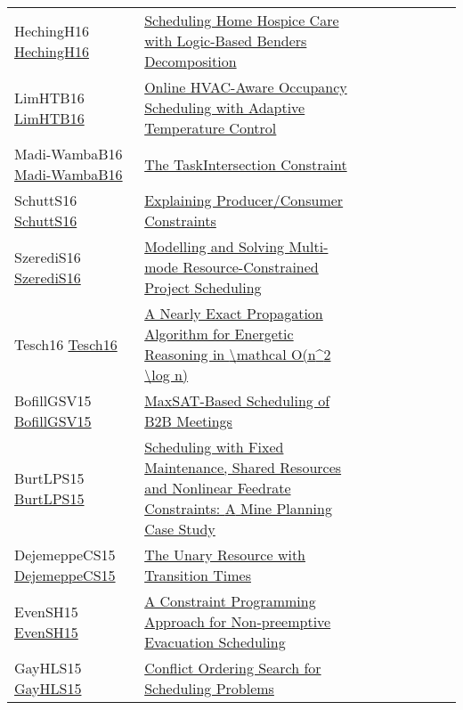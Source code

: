 {\begin{longtable}{p{3cm}p{7cm}lllllll}
HechingH16 \href{https://doi.org/10.1007/978-3-319-33954-2\_14}{HechingH16} &  \href{papers/HechingH16.pdf}{Scheduling Home Hospice Care with Logic-Based Benders Decomposition} &  &  &  &  &  &  & \\
LimHTB16 \href{https://doi.org/10.1007/978-3-319-44953-1\_43}{LimHTB16} &  \href{papers/LimHTB16.pdf}{Online HVAC-Aware Occupancy Scheduling with Adaptive Temperature Control} &  &  &  &  &  &  & \\
Madi-WambaB16 \href{https://doi.org/10.1007/978-3-319-33954-2\_18}{Madi-WambaB16} &  \href{papers/Madi-WambaB16.pdf}{The TaskIntersection Constraint} &  &  &  &  &  &  & \\
SchuttS16 \href{https://doi.org/10.1007/978-3-319-44953-1\_28}{SchuttS16} &  \href{papers/SchuttS16.pdf}{Explaining Producer/Consumer Constraints} &  &  &  &  &  &  & \\
SzerediS16 \href{https://doi.org/10.1007/978-3-319-44953-1\_31}{SzerediS16} &  \href{papers/SzerediS16.pdf}{Modelling and Solving Multi-mode Resource-Constrained Project Scheduling} &  &  &  &  &  &  & \\
Tesch16 \href{https://doi.org/10.1007/978-3-319-44953-1\_32}{Tesch16} &  \href{papers/Tesch16.pdf}{A Nearly Exact Propagation Algorithm for Energetic Reasoning in {\textbackslash}mathcal O(n{\^{}}2 {\textbackslash}log n)} &  &  &  &  &  &  & \\
BofillGSV15 \href{https://doi.org/10.1007/978-3-319-18008-3\_5}{BofillGSV15} &  \href{papers/BofillGSV15.pdf}{MaxSAT-Based Scheduling of {B2B} Meetings} &  &  &  &  &  &  & \\
BurtLPS15 \href{https://doi.org/10.1007/978-3-319-18008-3\_7}{BurtLPS15} &  \href{papers/BurtLPS15.pdf}{Scheduling with Fixed Maintenance, Shared Resources and Nonlinear Feedrate Constraints: {A} Mine Planning Case Study} &  &  &  &  &  &  & \\
DejemeppeCS15 \href{https://doi.org/10.1007/978-3-319-23219-5\_7}{DejemeppeCS15} &  \href{papers/DejemeppeCS15.pdf}{The Unary Resource with Transition Times} &  &  &  &  &  &  & \\
EvenSH15 \href{https://doi.org/10.1007/978-3-319-23219-5\_40}{EvenSH15} &  \href{papers/EvenSH15.pdf}{A Constraint Programming Approach for Non-preemptive Evacuation Scheduling} &  &  &  &  &  &  & \\
GayHLS15 \href{https://doi.org/10.1007/978-3-319-23219-5\_10}{GayHLS15} &  \href{papers/GayHLS15.pdf}{Conflict Ordering Search for Scheduling Problems} &  &  &  &  &  &  & \\

\end{longtable}}
